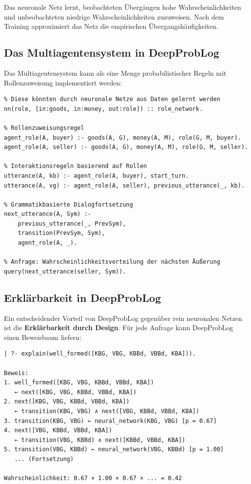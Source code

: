 \documentclass[12pt,a4paper]{article}
\begin{document}
Das neuronale Netz lernt, beobachteten Übergängen hohe Wahrscheinlichkeiten 
und unbeobachteten niedrige Wahrscheinlichkeiten zuzuweisen. Nach dem Training 
approximiert das Netz die empirischen Übergangshäufigkeiten.

\subsection{Das Multiagentensystem in DeepProbLog}

Das Multiagentensystem kann als eine Menge probabilistischer Regeln mit 
Rollenzuweisung implementiert werden:

\begin{lstlisting}[caption=Multiagentensystem in DeepProbLog]
% Agentenrollen basierend auf Waren- und Geldausstattung
% Diese könnten durch neuronale Netze aus Daten gelernt werden
nn(role, [in:goods, in:money, out:role]) :: role_network.

% Rollenzuweisungsregel
agent_role(A, buyer) :- goods(A, G), money(A, M), role(G, M, buyer).
agent_role(A, seller) :- goods(A, G), money(A, M), role(G, M, seller).

% Interaktionsregeln basierend auf Rollen
utterance(A, kb) :- agent_role(A, buyer), start_turn.
utterance(A, vg) :- agent_role(A, seller), previous_utterance(_, kb).

% Grammatikbasierte Dialogfortsetzung
next_utterance(A, Sym) :-
    previous_utterance(_, PrevSym),
    transition(PrevSym, Sym),
    agent_role(A, _).

% Anfrage: Wahrscheinlichkeitsverteilung der nächsten Äußerung
query(next_utterance(seller, Sym)).
\end{lstlisting}

\subsection{Erklärbarkeit in DeepProbLog}

Ein entscheidender Vorteil von DeepProbLog gegenüber rein neuronalen Netzen 
ist die \textbf{Erklärbarkeit durch Design}. Für jede Anfrage kann DeepProbLog 
einen Beweisbaum liefern:

\begin{lstlisting}[caption=Erklärbarkeitsausgabe]
| ?- explain(well_formed([KBG, VBG, KBBd, VBBd, KBA])).

Beweis:
1. well_formed([KBG, VBG, KBBd, VBBd, KBA])
   ← next([KBG, VBG, KBBd, VBBd, KBA])
2. next([KBG, VBG, KBBd, VBBd, KBA])
   ← transition(KBG, VBG) ∧ next([VBG, KBBd, VBBd, KBA])
3. transition(KBG, VBG) ← neural_network(KBG, VBG) [p = 0.67]
4. next([VBG, KBBd, VBBd, KBA])
   ← transition(VBG, KBBd) ∧ next([KBBd, VBBd, KBA])
5. transition(VBG, KBBd) ← neural_network(VBG, KBBd) [p = 1.00]
   ... (Fortsetzung)

Wahrscheinlichkeit: 0.67 × 1.00 × 0.67 × ... = 0.42
\end{lstlisting}
\end{document}
